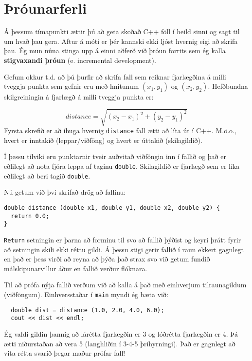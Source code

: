 \section{Þróunarferli}
\label{distance}

Á þessum tímapunkti ættir þú að geta skoðað C++ föll í heild sinni og sagt til um hvað þau gera.
Aftur á móti er þér kannski ekki ljóst hvernig eigi að skrifa þau.
Ég mun núna stinga upp á einni aðferð við þróun forrits sem ég kalla {\bf stigvaxandi þróun} (e. incremental development).


Gefum okkur t.d. að þú þurfir að skrifa fall sem reiknar fjarlægðina á milli tveggja punkta sem gefnir eru með hnitunum $(x_1, y_1)$ og $(x_2, y_2)$.
Hefðbundna skilgreiningin á fjarlægð á milli tveggja punkta er:

\begin{equation}
distance = \sqrt{(x_2 - x_1)^2 + (y_2 - y_1)^2}
\end{equation}
%
Fyrsta skrefið er að íhuga hvernig {\tt distance} fall ætti að líta út í C++.
M.ö.o., hvert er inntakið (leppar/viðföng) og hvert er úttakið (skilagildið).

Í þessu tilviki eru punktarnir tveir auðvitað viðföngin inn í fallið og það er eðlilegt að nota fjóra leppa af taginu {\tt double}.
Skilagildið er fjarlægð sem er líka eðlilegt að beri tagið {\tt double}.

Nú getum við því skrifað drög að fallinu:

\begin{verbatim}
double distance (double x1, double y1, double x2, double y2) {
  return 0.0;
}
\end{verbatim}
%
{\tt Return} setningin er þarna að forminu til svo að fallið þýðist og keyri þrátt fyrir að setningin skili ekki réttu gildi.
Á þessu stigi gerir fallið í raun ekkert gagnlegt en það er þess virði að reyna að þýða það strax svo við getum fundið málskipunarvillur áður en fallið verður flóknara.

Til að prófa nýja fallið verðum við að kalla á það með einhverjum tilraunagildum (viðföngum).
Einhversstaðar í {\tt main} myndi ég bæta við:

\begin{verbatim}
  double dist = distance (1.0, 2.0, 4.0, 6.0);
  cout << dist << endl;
\end{verbatim}
%
Ég valdi gildin þannig að lárétta fjarlægðin er 3 og lóðrétta fjarlægðin er 4.
Þá ætti niðurstaðan að vera 5 (langhliðin í 3-4-5 þríhyrningi).
Það er gagnlegt að vita rétta svarið þegar maður prófar fall!

